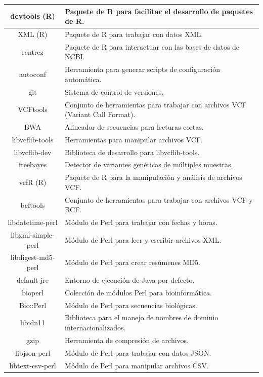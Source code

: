 \documentclass[12pt]{article}
\begin{document}
\begin{longtable}{|c|p{6cm}|}
    \hline
    devtools (R) & Paquete de R para facilitar el desarrollo de paquetes de R. \\
    \hline
    XML (R) & Paquete de R para trabajar con datos XML. \\
    \hline
    rentrez & Paquete de R para interactuar con las bases de datos de NCBI. \\
    \hline
    autoconf & Herramienta para generar scripts de configuración automática. \\
    \hline
    git & Sistema de control de versiones. \\
    \hline
    VCFtools & Conjunto de herramientas para trabajar con archivos VCF (Variant Call Format). \\
    \hline
    BWA & Alineador de secuencias para lecturas cortas. \\
    \hline
    libvcflib-tools & Herramientas para manipular archivos VCF. \\
    \hline
    libvcflib-dev & Biblioteca de desarrollo para libvcflib-tools. \\
    \hline
    freebayes & Detector de variantes genéticas de múltiples muestras. \\
    \hline
    vcfR (R) & Paquete de R para la manipulación y análisis de archivos VCF. \\
    \hline
    bcftools & Conjunto de herramientas para trabajar con archivos VCF y BCF. \\
    \hline
    libdatetime-perl & Módulo de Perl para trabajar con fechas y horas. \\
    \hline
    libxml-simple-perl & Módulo de Perl para leer y escribir archivos XML. \\
    \hline
    libdigest-md5-perl & Módulo de Perl para crear resúmenes MD5. \\
    \hline
    default-jre & Entorno de ejecución de Java por defecto. \\
    \hline
    bioperl & Colección de módulos Perl para bioinformática. \\
    \hline
    Bio::Perl & Módulo de Perl para secuencias biológicas. \\
    \hline
    libidn11 & Biblioteca para el manejo de nombres de dominio internacionalizados. \\
    \hline
    gzip & Herramienta de compresión de archivos. \\
    \hline
    libjson-perl & Módulo de Perl para trabajar con datos JSON. \\
    \hline
    libtext-csv-perl & Módulo de Perl para manipular archivos CSV. \\

\end{longtable}
\end{document}
